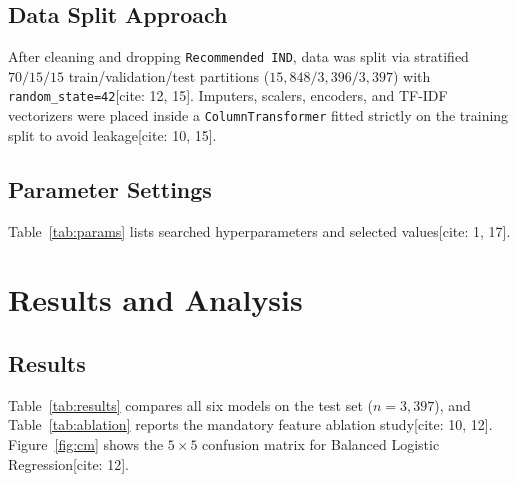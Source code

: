 \documentclass[10pt,twocolumn,a4paper]{IEEEtran}
\begin{document}
\subsection{Data Split Approach}
After cleaning and dropping \texttt{Recommended IND}, data was split via stratified $70/15/15$ train/validation/test partitions ($15,848 / 3,396 / 3,397$) with \texttt{random\_state=42}[cite: 12, 15]. Imputers, scalers, encoders, and TF-IDF vectorizers were placed inside a \texttt{ColumnTransformer} fitted strictly on the training split to avoid leakage[cite: 10, 15].

\subsection{Parameter Settings}
Table~\ref{tab:params} lists searched hyperparameters and selected values[cite: 1, 17].

\begin{table}[h]
\centering
\caption{Hyperparameter search and selected settings.}
\label{tab:params}
\footnotesize
{}
\end{table}

\section{Results and Analysis}
\subsection{Results}
Table~\ref{tab:results} compares all six models on the test set ($n=3,397$), and Table~\ref{tab:ablation} reports the mandatory feature ablation study[cite: 10, 12]. Figure~\ref{fig:cm} shows the $5 \times 5$ confusion matrix for Balanced Logistic Regression[cite: 12].
\end{document}
